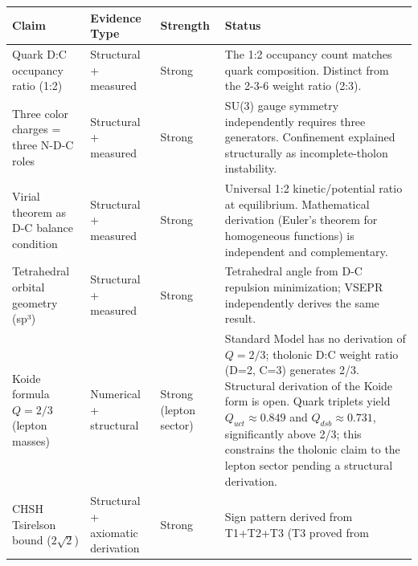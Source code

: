 \documentclass[
  11pt,
  letterpaper,
]{article}
\begin{document}
\begin{longtable}[]{@{}
  >{\raggedright\arraybackslash}p{}
  >{\raggedright\arraybackslash}p{}
  >{\raggedright\arraybackslash}p{}
  >{\raggedright\arraybackslash}p{}@{}}
\toprule\noalign{}
\begin{minipage}[b]{\linewidth}\raggedright
Claim
\end{minipage} & \begin{minipage}[b]{\linewidth}\raggedright
Evidence Type
\end{minipage} & \begin{minipage}[b]{\linewidth}\raggedright
Strength
\end{minipage} & \begin{minipage}[b]{\linewidth}\raggedright
Status
\end{minipage} \\
\midrule\noalign{}
\endhead
\bottomrule\noalign{}
\endlastfoot
Quark D:C occupancy ratio (1:2) & Structural + measured & Strong & The
1:2 occupancy count matches quark composition. Distinct from the 2-3-6
weight ratio (2:3). \\
Three color charges = three N-D-C roles & Structural + measured & Strong
& SU(3) gauge symmetry independently requires three generators.
Confinement explained structurally as incomplete-tholon instability. \\
Virial theorem as D-C balance condition & Structural + measured & Strong
& Universal 1:2 kinetic/potential ratio at equilibrium. Mathematical
derivation (Euler's theorem for homogeneous functions) is independent
and complementary. \\
Tetrahedral orbital geometry (sp³) & Structural + measured & Strong &
Tetrahedral angle from D-C repulsion minimization; VSEPR independently
derives the same result. \\
Koide formula \(Q = 2/3\) (lepton masses) & Numerical + structural &
Strong (lepton sector) & Standard Model has no derivation of
\(Q = 2/3\); tholonic D:C weight ratio (D=2, C=3) generates 2/3.
Structural derivation of the Koide form is open. Quark triplets yield
\(Q_{uct} \approx 0.849\) and \(Q_{dsb} \approx 0.731\), significantly
above 2/3; this constrains the tholonic claim to the lepton sector
pending a structural derivation. \\
CHSH Tsirelson bound (\(2\sqrt{2}\)) & Structural + axiomatic derivation
& Strong & Sign pattern derived from T1+T2+T3 (T3 proved from

\end{longtable}
\end{document}
